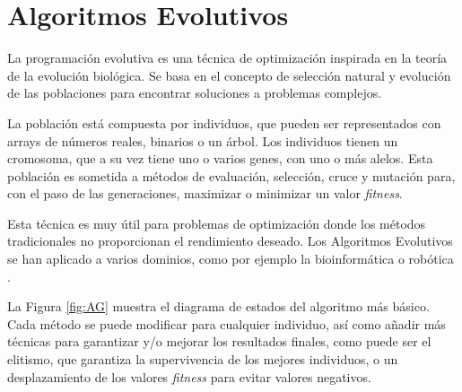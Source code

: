 		\newpage

		
		









\section{Algoritmos Evolutivos}


	La programación evolutiva es una técnica de optimización inspirada en la teoría de la evolución biológica. Se basa en el concepto de selección natural y evolución de las poblaciones para encontrar soluciones a problemas complejos. 
	
	La población está compuesta por individuos, que pueden ser representados con arrays de números reales, binarios o un árbol. Los individuos tienen un cromosoma, que a su vez tiene uno o varios genes, con uno o más alelos. Esta población es sometida a métodos de evaluación, selección, cruce y mutación para, con el paso de las generaciones, maximizar o minimizar un valor \textit{fitness}.
	
	Esta técnica es muy útil para problemas de optimización donde los métodos tradicionales no proporcionan el rendimiento deseado. Los Algoritmos Evolutivos se han aplicado a varios dominios, como por ejemplo la bioinformática o robótica \cite{contreras2015mobile}.
	
	La Figura \ref{fig:AG} muestra el diagrama de estados del algoritmo más básico. Cada método se puede modificar para cualquier individuo, así como añadir más técnicas para garantizar y/o mejorar los resultados finales, como puede ser el elitismo, que garantiza la supervivencia de los mejores individuos, o un desplazamiento de los valores \textit{fitness} para evitar valores negativos. 


